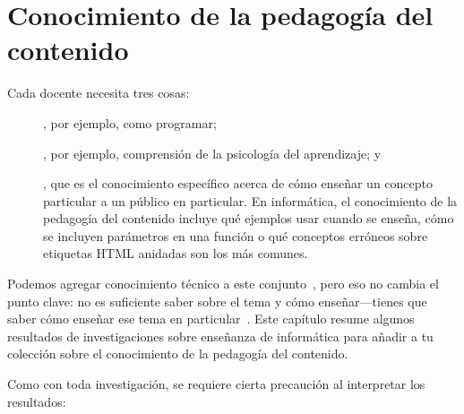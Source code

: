 \chapter{Conocimiento de la pedagogía del contenido}\label{s:pck}

Cada docente necesita tres cosas:

\begin{description}

\item[],
  por ejemplo, como programar;

\item[],
  por ejemplo, comprensión de la psicología del aprendizaje;
  y

\item[],
  que es el conocimiento específico acerca de cómo enseñar un concepto particular a un público en particular.
  En informática,
  el conocimiento de la pedagogía del contenido incluye qué ejemplos usar cuando se enseña, cómo se incluyen parámetros en una función o qué conceptos erróneos sobre etiquetas HTML anidadas son los más comunes.
\end{description}

Podemos agregar conocimiento técnico a este conjunto~\cite{Koeh2013},
pero eso no cambia el punto clave: no es suficiente saber sobre el tema y cómo enseñar---tienes que saber cómo enseñar ese tema en particular~\cite{Maye2004}.
Este capítulo resume algunos resultados de investigaciones sobre enseñanza de informática para añadir a tu colección sobre el conocimiento de la pedagogía del contenido.

Como con toda investigación,
se requiere cierta precaución al interpretar los resultados:

